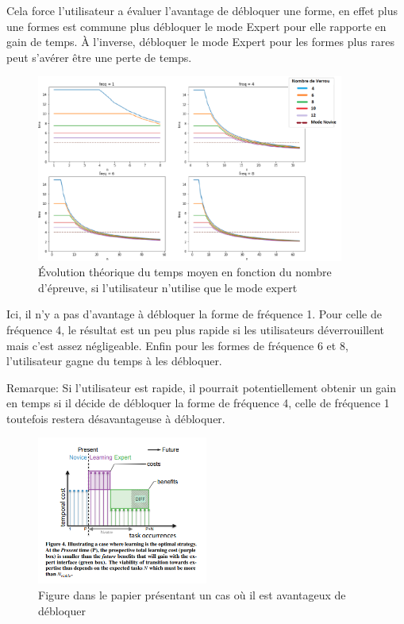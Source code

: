 \documentclass[a4paper, 12pt]{report}
\begin{document}
        Cela force l'utilisateur a évaluer l'avantage de débloquer une forme, en effet plus une formes est
        commune plus débloquer le mode Expert pour elle rapporte en gain de temps. À l'inverse, débloquer
        le mode Expert pour les formes plus rares peut s'avérer être une perte de temps.
        
        \begin{figure}[H]
            \centering
            \includegraphics[width=0.9\textwidth]{img/fig3.png}
            \caption{Évolution théorique du temps moyen en fonction du nombre d'épreuve, si l'utilisateur n'utilise que le mode expert}
        \end{figure}
        
        Ici, il n'y a pas d'avantage à débloquer la forme de fréquence 1. Pour celle de fréquence 4, le 
        résultat est un peu plus rapide si les utilisateurs déverrouillent mais c'est assez négligeable. Enfin pour les formes de fréquence 6 et 8, 
        l'utilisateur gagne du temps à les débloquer.
        
        Remarque: Si l'utilisateur est rapide, il pourrait potentiellement obtenir un gain en temps
        si il décide de débloquer la forme de fréquence 4, celle de fréquence 1 toutefois
        restera désavantageuse à débloquer.
        
        \begin{figure}[H]
            \centering
            \includegraphics[width=0.5\textwidth]{img/fig2.png}
            \caption{Figure dans le papier présentant un cas où il est avantageux de débloquer}
        \end{figure}
        
\end{document}
